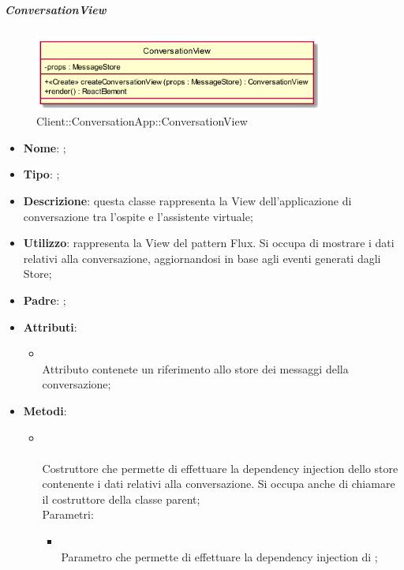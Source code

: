 \hypertarget{ConversationView_label}{\subparagraph{ConversationView}}
\begin{figure}[h]
	\centering
	\includegraphics[width=0.85\textwidth,height=\textheight,keepaspectratio]{images/ClassConversationView.png}
	\caption{Client::ConversationApp::ConversationView}
\end{figure}
\begin{itemize}
	\item \textbf{Nome}: ;
	\item \textbf{Tipo}: ;
	\item \textbf{Descrizione}: questa classe rappresenta la View dell'applicazione di conversazione tra l'ospite e l'assistente virtuale;
	\item \textbf{Utilizzo}: rappresenta la View del pattern Flux. Si occupa di mostrare i dati relativi alla conversazione, aggiornandosi in base agli eventi generati dagli Store;
	\item \textbf{Padre}: ;
	\item \textbf{Attributi}:
	\begin{itemize}
		\item[]  \\
		Attributo contenete un riferimento allo store dei messaggi della conversazione;
	\end{itemize}
	\item \textbf{Metodi}:
	\begin{itemize}
		\item[] \\ \\		Costruttore che permette di effettuare la dependency injection dello store contenente i dati relativi alla conversazione. Si occupa anche di chiamare il costruttore della classe parent;\\
		Parametri:
		\begin{itemize}
			\item {} \\
			Parametro che permette di effettuare la dependency injection di ;

\end{itemize}
\end{itemize}
\end{itemize}
